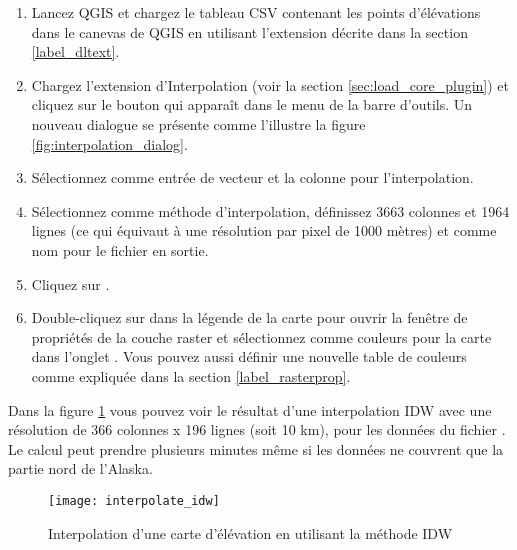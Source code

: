 \begin{enumerate}
  \item Lancez QGIS et chargez le tableau CSV  contenant les points d'\'el\'evations dans le canevas de QGIS en utilisant l'extension d\'ecrite dans la section \ref{label_dltext}. 
  \item Chargez l'extension d'Interpolation (voir la section \ref{sec:load_core_plugin}) et cliquez sur le bouton  qui appara\^it dans le menu de la barre d'outils. Un nouveau dialogue se pr\'esente comme l'illustre la figure \ref{fig:interpolation_dialog}.
  \item S\'electionnez  comme entr\'ee de vecteur et la colonne  pour l'interpolation.
  \item S\'electionnez  comme m\'ethode d'interpolation, d\'efinissez 3663 colonnes et 1964 lignes (ce qui \'equivaut \`a une r\'esolution par pixel de 1000 m\`etres) et  comme nom pour le fichier en sortie.
  \item Cliquez sur .
  \item Double-cliquez sur  dans la l\'egende de la carte pour ouvrir la fen\^etre de propri\'et\'es de la couche raster et s\'electionnez  comme couleurs pour la carte dans l'onglet . Vous pouvez aussi d\'efinir une nouvelle table de couleurs comme expliqu\'ee dans la section \ref{label_rasterprop}.
\end{enumerate}

%
%

Dans la figure \ref{fig:interpolation_idw} vous pouvez voir le r\'esultat d'une interpolation IDW avec une r\'esolution de 366 colonnes x 196 lignes (soit 10 km), pour les donn\'ees du fichier . Le calcul peut prendre plusieurs minutes m\^eme si les donn\'ees ne couvrent que la partie nord de l'Alaska.

\begin{figure}[ht]
   \begin{center}
   \caption{Interpolation d'une carte d'\'el\'evation en utilisant la m\'ethode IDW \nixcaption}\label{fig:interpolation_idw}\smallskip
   \texttt{[image: interpolate\_idw]}
\end{center}  
\end{figure}

\newpage
